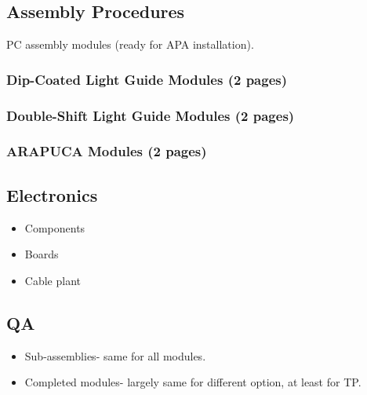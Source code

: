 

\subsection{Assembly Procedures}
\label{sec:fdsp-pd-assy-ap}

PC assembly modules (ready for APA installation).


\subsubsection{Dip-Coated Light Guide Modules (2 pages)}
\label{ssec:fdsp-pd-pc-assy-bar1}

\subsubsection{Double-Shift Light Guide Modules (2 pages)}
\label{ssec:fdsp-pd-pc-assy-bar2}

\subsubsection{ARAPUCA Modules (2 pages)}
\label{ssec:fdsp-pd-pc-assy-arapuca}


\subsection{Electronics}
\label{sec:fdsp-pd-assy-pde}


\begin{itemize}
\item Components
\item Boards
\item Cable plant
\end{itemize}

\subsection{QA}
\label{sec:fdsp-pd-assy-qa}

\begin{itemize}
\item Sub-assemblies- same for all modules.
\item Completed modules- largely same for different option, at least for TP.
\end{itemize}

